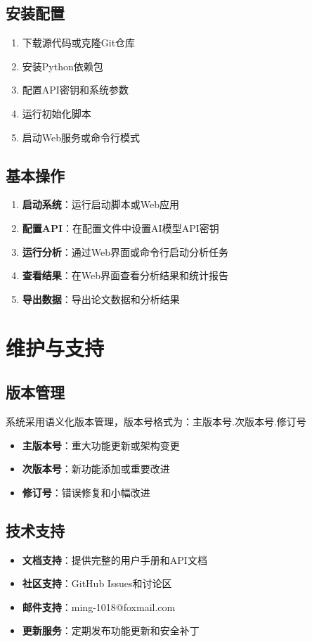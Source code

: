 \documentclass[12pt,a4paper]{article}
\begin{document}
\subsection{安装配置}
\begin{enumerate}
    \item 下载源代码或克隆Git仓库
    \item 安装Python依赖包
    \item 配置API密钥和系统参数
    \item 运行初始化脚本
    \item 启动Web服务或命令行模式
\end{enumerate}

\subsection{基本操作}
\begin{enumerate}
    \item \textbf{启动系统}：运行启动脚本或Web应用
    \item \textbf{配置API}：在配置文件中设置AI模型API密钥
    \item \textbf{运行分析}：通过Web界面或命令行启动分析任务
    \item \textbf{查看结果}：在Web界面查看分析结果和统计报告
    \item \textbf{导出数据}：导出论文数据和分析结果
\end{enumerate}

\section{维护与支持}

\subsection{版本管理}
系统采用语义化版本管理，版本号格式为：主版本号.次版本号.修订号
\begin{itemize}
    \item \textbf{主版本号}：重大功能更新或架构变更
    \item \textbf{次版本号}：新功能添加或重要改进
    \item \textbf{修订号}：错误修复和小幅改进
\end{itemize}

\subsection{技术支持}
\begin{itemize}
    \item \textbf{文档支持}：提供完整的用户手册和API文档
    \item \textbf{社区支持}：GitHub Issues和讨论区
    \item \textbf{邮件支持}：ming-1018@foxmail.com
    \item \textbf{更新服务}：定期发布功能更新和安全补丁
\end{itemize}
\end{document}
